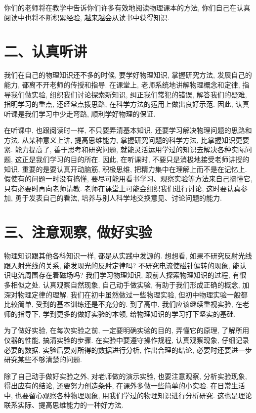 \documentclass[10pt]{article}
\begin{document}
你们的老师将在教学中告诉你们许多有效地阅读物理课本的方法, 你们自己在认真阅读中也将不断积累经验, 越来越会从读书中获得知识.

\section*{二、认真听讲}

我们在自己的物理知识还不多的时候, 要学好物理知识, 掌握研究方法, 发展自己的能力, 都离不开老师的传授和指导. 在课堂上, 老师系统地讲解物理概念和定律, 指导我们做实验, 组织我们讨论探索新知识, 纠正我们常犯的错误, 解答我们的疑难, 指明学习的重点, 还经常点拨思路, 在科学方法的运用上做出良好示范. 因此, 认真听课是我们学习中少走弯路, 顺利学好物理的保证.

在听课中, 也跟阅读时一样, 不只要弄清基本知识, 还要学习解决物理问题的思路和方法. 从某种意义上讲, 提高思维能力, 掌握研究问题的科学方法, 比掌握知识更要紧. 能力提高了, 善于思考和研究问题, 就能灵活运用学过的知识去解决各种实际问题, 这正是我们学习的目的所在. 因此, 在听课时, 不要只是消极地接受老师讲授的知识, 重要的是要认真开动脑筋, 积极思维, 把精力集中在理解上而不是在记忆上. 假使有的问题一时没有搞懂, 要尽可能用看书学习、观察实验等方法来自己搞懂它, 只有必要时再向老师请教. 老师在课堂上可能会组织我们进行讨论, 这时要认真参加, 勇于发表自己的看法, 培养与别人科学地交换意见、讨论问题的能力.

\section*{三、注意观察, 做好实验}

物理知识跟其他各科知识一样, 都是从实践中发源的. 想想看, 如果不研究反射光线跟入射光线的关系, 能发现光的反射定律吗? 不研究电流使磁针偏转的现象, 能认识电流周围存在着磁场吗? 我们学习物理知识, 跟前人探索物理知识的过程, 有很多相似之处. 认真观察自然现象, 自己动手做实验, 有助于我们形成正确的概念, 加深对物理定律的理解. 我们在初中虽然做过一些物理实验, 但初中物理实验一般都比较简单, 受到的基本训练还是不充分的. 到了高中, 我们应该继续重视实验, 在老师的指导下, 学到更多的做好实验的本领, 给物理知识的学习打下坚实的基础.

为了做好实验, 在每次实验之前, 一定要明确实验的目的, 弄懂它的原理, 了解所用仪器的性能, 搞清实验的步骤. 在实验中要遵守操作规程, 认真观察现象, 仔细记录必要的数据. 实验后要对所得的数据进行分析, 作出合理的结论, 必要时还要进一步研究某些不够清楚的问题.

除了自己动手做好实验之外, 对老师做的演示实验, 也要注意观察, 分析实验现象, 得出应有的结论, 还要努力创造条件, 在课外多做一些简单的小实验. 在日常生活中, 也要留心观察各种物理现象, 用我们学过的物理知识进行分析研究. 这也是理论联系实际、提高思维能力的一种好方法.
\end{document}
